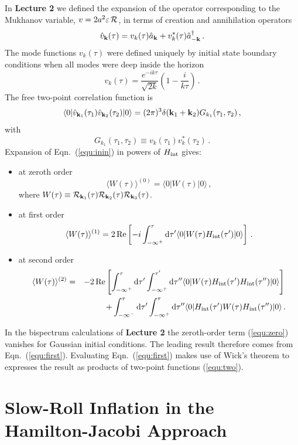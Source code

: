 \documentclass[12pt,letterpaper,rotate]{article}
\def\beq{\begin{equation}}
\def\eeq{\end{equation}}
\def\bea{\begin{eqnarray}}
\def\eea{\end{eqnarray}}
\def\d{{\rm d}}
\def\R{{\cal R}}
\begin{document}
{In {\bf Lecture 2} we defined the expansion of the operator corresponding to the Mukhanov variable, $v = 2 a^2 \varepsilon\, \R$, in terms of creation and annihilation operators
\beq
\hat v_{\bf k}(\tau) = v_k(\tau) \hat a_{\bf k} + v_k^*(\tau) \hat a_{-{\bf k}}^\dagger\, .
\eeq
The mode functions $v_k(\tau)$ were defined uniquely by initial state boundary conditions when all modes were deep inside the horizon
\beq
v_k(\tau) = \frac{e^{-ik \tau}}{\sqrt{2k}} \left( 1 - \frac{i}{k \tau}\right)\, .
\eeq
The free two-point correlation function is
\beq
\langle 0 | \hat v_{{\bf k}_1}(\tau_1) \hat v_{{\bf k}_2}(\tau_2) |0 \rangle = (2\pi)^3 \delta({\bf k}_1+{\bf k}_2) G_{k_1}(\tau_1, \tau_2)\, ,
\eeq
with
\beq
\label{equ:two}
G_{k_1}(\tau_1, \tau_2) \equiv v_k(\tau_1) v_k^*(\tau_2)\, .
\eeq
Expansion of Eqn.~(\ref{equ:inin}) in powers of $H_{\rm int}$ gives:
\begin{itemize}
\item at zeroth order
\beq
\label{equ:zero}
\langle W(\tau) \rangle^{(0)}= \langle 0| W(\tau) | 0 \rangle\, ,
\eeq
where  $W(\tau) \equiv \R_{{\bf k}_1}(\tau) \R_{{\bf k}_2}(\tau) \R_{{\bf k}_3}(\tau)$.
\item at first order
\beq
\label{equ:first}
\langle W(\tau) \rangle^{(1)}= 2 \,{\rm Re} \left[ - i \int_{-\infty^+}^\tau \d \tau' \langle 0| W(\tau) H_{\rm int}(\tau') | 0 \rangle \right]\, .
\eeq
\item at second order
\bea
\langle W(\tau) \rangle^{(2)} &=& - 2\, {\rm Re} \left[ \int_{-\infty^+}^\tau \d \tau'   \int_{-\infty^+}^{\tau'} \d \tau''  \langle 0| W(\tau) H_{\rm int}(\tau') H_{\rm int}(\tau'') | 0 \rangle \right]\, \nonumber \\
&& \qquad + \int_{-\infty^-}^\tau \d \tau' \int_{-\infty^+}^\tau \d \tau'' \langle 0 | H_{\rm int}(\tau') W(\tau) H_{\rm int}(\tau'') | 0 \rangle\, .
\eea
\end{itemize}
In the bispectrum calculations of {\bf Lecture 2} the zeroth-order term (\ref{equ:zero}) vanishes for Gaussian initial conditions. The leading result therefore comes from Eqn.~(\ref{equ:first}).
Evaluating Eqn.~(\ref{equ:first}) makes use of Wick's theorem to expresses the result as products of two-point functions (\ref{equ:two}).


\newpage
\section{Slow-Roll Inflation in the Hamilton-Jacobi Approach}
\label{sec:HSR}
\setcounter{equation}{0}
\renewcommand{\theequation}{B.\arabic{equation}}

}
\end{document}
